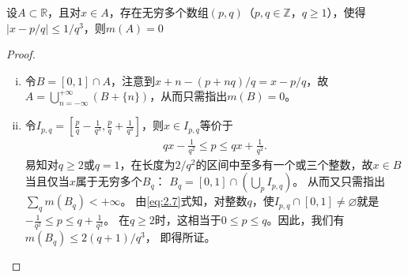 \documentclass[../../main.tex]{subfiles}
\begin{document}
\begin{example}
设\(A\subset\mathbb{R}\)，且对\(x\in A\)，存在无穷多个数组\((p,q)\)（\(p,q\in\mathbb{Z}\)，\(q\geqslant1\)），使得\(\vert x - p/q\vert\leqslant1/q^3\)，则\(m(A)=0\)
\end{example}
\begin{proof}
\begin{enumerate}[(i)]
\item 令\(B = [0,1]\cap A\)，注意到\(x + n-(p + nq)/q=x - p/q\)，故\(A=\bigcup_{n = -\infty}^{+\infty}(B+\{n\})\)，从而只需指出\(m(B)=0\)。
\item 令\(I_{p,q}=\left[\frac{p}{q}-\frac{1}{q^3},\frac{p}{q}+\frac{1}{q^3}\right]\)，则\(x\in I_{p,q}\)等价于
\begin{align}
qx-\frac{1}{q^2}\leqslant p\leqslant qx+\frac{1}{q^2}.\label{eq:2.7}
\end{align}
易知对\(q\geqslant2\)或\(q = 1\)，在长度为\(2/q^2\)的区间中至多有一个或三个整数，故\(x\in B\)当且仅当\(x\)属于无穷多个\(B_q\)：
\(B_q = [0,1]\cap\left(\bigcup_{p}I_{p,q}\right)\)。
从而又只需指出\(\sum_{q}m(B_q)<+\infty\)。
由\eqref{eq:2.7}式知，对整数\(q\)，使\(I_{p,q}\cap[0,1]\neq\varnothing\)就是
\(-\frac{1}{q^2}\leqslant p\leqslant q+\frac{1}{q^2}\)。
在\(q\geqslant2\)时，这相当于\(0\leqslant p\leqslant q\)。因此，我们有
\(m(B_q)\leqslant 2(q + 1)/q^3\)，
即得所证。
\end{enumerate} 

\end{proof}
\end{document}
